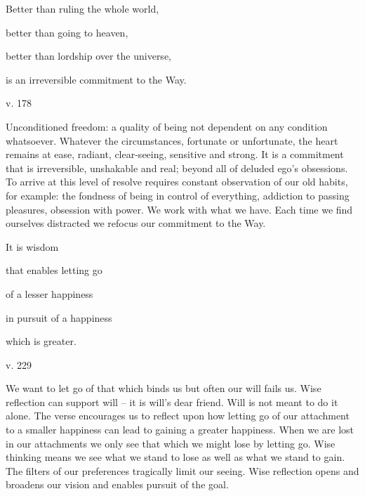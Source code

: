 \documentclass[a4paper,portrait,12pt]{article}
\begin{document}
Better than ruling the whole world,


better than going to heaven,


better than lordship over the universe,


is an irreversible commitment to the Way.





v. 178





Unconditioned freedom: a quality of being not dependent on any condition whatsoever. Whatever the circumstances, fortunate or unfortunate, the heart remains at ease, radiant, clear-seeing, sensitive and strong. It is a commitment that is irreversible, unshakable and real; beyond all of deluded ego's obsessions. To arrive at this level of resolve requires constant observation of our old habits, for example: the fondness of being in control of everything, addiction to passing pleasures, obsession with power. We work with what we have. Each time we find ourselves distracted we refocus our commitment to the Way.














It is wisdom


that enables letting go


of a lesser happiness


in pursuit of a happiness


which is greater.





v. 229





We want to let go of that which binds us but often our will fails us. Wise reflection can support will -- it is will's dear friend. Will is not meant to do it alone. The verse encourages us to reflect upon how letting go of our attachment to a smaller happiness can lead to gaining a greater happiness. When we are lost in our attachments we only see that which we might lose by letting go. Wise thinking means we see what we stand to lose as well as what we stand to gain. The filters of our preferences tragically limit our seeing. Wise reflection opens and broadens our vision and enables pursuit of the goal.
\end{document}
